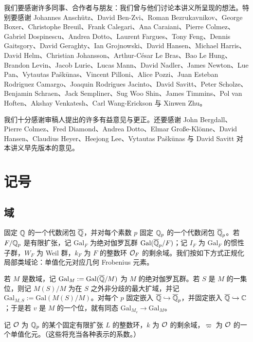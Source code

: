 我们要感谢许多同事、合作者与朋友：我们曾与他们讨论本讲义所呈现的想法。特别要感谢 Johannes Anschütz、David Ben-Zvi、Roman Bezrukavnikov、George Boxer、Christophe Breuil、Frank Calegari、Ana Caraiani、Pierre Colmez、Gabriel Dospinescu、Andrea Dotto、Laurent Fargues、Tony Feng、Dennis Gaitsgory、David Geraghty、Ian Grojnowski、David Hansen、Michael Harris、David Helm、Christian Johansson、Arthur-César Le Bras、Bao Le Hung、Brandon Levin、Jacob Lurie、Lucas Mann、David Nadler、James Newton、Lue Pan、Vytautas Paškūnas、Vincent Pilloni、Alice Pozzi、Juan Esteban Rodriguez Camargo、Joaquin Rodrigues Jacinto、David Savitt、Peter Scholze、Benjamin Schraen、Jack Sempliner、Sug Woo Shin、James Timmins、Pol van Hoften、Akshay Venkatesh、Carl Wang-Erickson 与 Xinwen Zhu。

我们十分感谢审稿人提出的许多有益意见与更正。还要感谢 John Bergdall、Pierre Colmez、Fred Diamond、Andrea Dotto、Elmar Große-Klönne、David Hansen、Claudius Heyer、Heejong Lee、Vytautas Paškūnas 与 David Savitt 对本讲义早先版本的意见。

\section{记号}

\subsection{域}

固定 $\mathbb{Q}$ 的一个代数闭包 $\overline{\mathbb{Q}}$，并对每个素数 $p$ 固定 $\mathbb{Q}_p$ 的一个代数闭包 $\overline{\mathbb{Q}}_p$。若 $F/\mathbb{Q}_p$ 是有限扩张，记 $\mathrm{Gal}_F$ 为绝对伽罗瓦群 $\mathrm{Gal}(\overline{\mathbb{Q}}_p/F)$；记 $I_F$ 为 $\mathrm{Gal}_F$ 的惯性子群，$W_F$ 为 Weil 群，$k_F$ 为 $F$ 的整数环 $\mathcal{O}_F$ 的剩余域。我们按如下方式正规化局部类域论：单值化元对应几何 Frobenius 元素。

若 $M$ 是数域，记 $\mathrm{Gal}_M:=\mathrm{Gal}(\overline{\mathbb{Q}}/M)$ 为 $M$ 的绝对伽罗瓦群。若 $S$ 是 $M$ 的一集位，则记 $M(S)/M$ 为在 $S$ 之外非分歧的最大扩域，并记 $\mathrm{Gal}_{M,S}:=\mathrm{Gal}(M(S)/M)$。对每个 $p$ 固定嵌入 $\overline{\mathbb{Q}}\hookrightarrow\overline{\mathbb{Q}}_p$，并固定嵌入 $\overline{\mathbb{Q}}\hookrightarrow\mathbb{C}$；于是若 $v$ 是 $M$ 的一个位，就有同态 $\mathrm{Gal}_{M_v}\to\mathrm{Gal}_M$。

记 $\mathcal{O}$ 为 $\mathbb{Q}_p$ 的某个固定有限扩张 $L$ 的整数环，$k$ 为 $\mathcal{O}$ 的剩余域，$\varpi$ 为 $\mathcal{O}$ 的一个单值化元。（这些将充当各种表示的系数。）

